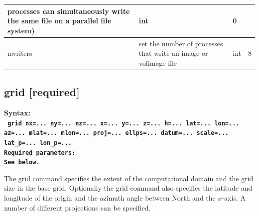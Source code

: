\documentclass[11pt]{report}
\begin{document}
{\begin{center}
\begin{tabular}{|l|p{8cm}|l|l|}
		processes can simultaneously write the same file on a parallel file system) & int                                                                         & 0                        \\ \hline
		nwriters                                                                    & set the number of processes that write an image or volimage file            & int       & 8            \\ \hline
	\end{tabular}
\end{center}

\subsection{grid [required]}
\label{keyword:grid}
\begin{flushleft}
	\bf Syntax:\\
	\tt
	grid nx=...  ny=...  nz=...
	x=... y=... z=... h=... lat=... lon=... az=... mlat=... mlon=... proj=... ellps=...
	datum=... scale=... lat\_p=... lon\_p=...\\
	\bf Required parameters:\\
	\rm See below.
\end{flushleft}
The grid command specifies the extent of the computational domain and the grid size in the base
grid. Optionally the grid command also specifies the latitude and longitude of the origin and the
azimuth angle between North and the $x$-axis. A number of different projections can be specified.

}
\end{document}
